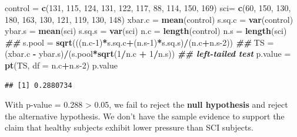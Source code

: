 \documentclass[
]{book}
\newenvironment{Shaded}{\begin{snugshade}}{\end{snugshade}}
\newcommand{\AttributeTok}[1]{\textcolor[rgb]{0.13,0.29,0.53}{#1}}
\newcommand{\DecValTok}[1]{\textcolor[rgb]{0.00,0.00,0.81}{#1}}
\newcommand{\DocumentationTok}[1]{\textcolor[rgb]{0.56,0.35,0.01}{\textbf{\textit{#1}}}}
\newcommand{\FunctionTok}[1]{\textcolor[rgb]{0.13,0.29,0.53}{\textbf{#1}}}
\newcommand{\NormalTok}[1]{#1}
\newcommand{\OtherTok}[1]{\textcolor[rgb]{0.56,0.35,0.01}{#1}}
\newcommand{\SpecialCharTok}[1]{\textcolor[rgb]{0.81,0.36,0.00}{\textbf{#1}}}
\begin{document}
\begin{Shaded}
\begin{Highlighting}[]
\NormalTok{control }\OtherTok{=} \FunctionTok{c}\NormalTok{(}\DecValTok{131}\NormalTok{, }\DecValTok{115}\NormalTok{, }\DecValTok{124}\NormalTok{, }\DecValTok{131}\NormalTok{, }\DecValTok{122}\NormalTok{, }\DecValTok{117}\NormalTok{, }\DecValTok{88}\NormalTok{, }\DecValTok{114}\NormalTok{, }\DecValTok{150}\NormalTok{, }\DecValTok{169}\NormalTok{)}
\NormalTok{sci}\OtherTok{=} \FunctionTok{c}\NormalTok{(}\DecValTok{60}\NormalTok{, }\DecValTok{150}\NormalTok{, }\DecValTok{130}\NormalTok{, }\DecValTok{180}\NormalTok{, }\DecValTok{163}\NormalTok{, }\DecValTok{130}\NormalTok{, }\DecValTok{121}\NormalTok{, }\DecValTok{119}\NormalTok{, }\DecValTok{130}\NormalTok{, }\DecValTok{148}\NormalTok{)}
\NormalTok{xbar.c }\OtherTok{=} \FunctionTok{mean}\NormalTok{(control)}
\NormalTok{s.sq.c }\OtherTok{=} \FunctionTok{var}\NormalTok{(control)}
\NormalTok{ybar.s }\OtherTok{=} \FunctionTok{mean}\NormalTok{(sci)}
\NormalTok{s.sq.s }\OtherTok{=} \FunctionTok{var}\NormalTok{(sci)}
\NormalTok{n.c }\OtherTok{=} \FunctionTok{length}\NormalTok{(control)}
\NormalTok{n.s }\OtherTok{=} \FunctionTok{length}\NormalTok{(sci)}
\DocumentationTok{\#\#}
\NormalTok{s.pool }\OtherTok{=} \FunctionTok{sqrt}\NormalTok{(((n.c}\DecValTok{{-}1}\NormalTok{)}\SpecialCharTok{*}\NormalTok{s.sq.c}\SpecialCharTok{+}\NormalTok{(n.s}\DecValTok{{-}1}\NormalTok{)}\SpecialCharTok{*}\NormalTok{s.sq.s)}\SpecialCharTok{/}\NormalTok{(n.c}\SpecialCharTok{+}\NormalTok{n.s}\DecValTok{{-}2}\NormalTok{))}
\DocumentationTok{\#\# }
\NormalTok{TS }\OtherTok{=}\NormalTok{ (xbar.c }\SpecialCharTok{{-}}\NormalTok{ ybar.s)}\SpecialCharTok{/}\NormalTok{(s.pool}\SpecialCharTok{*}\FunctionTok{sqrt}\NormalTok{(}\DecValTok{1}\SpecialCharTok{/}\NormalTok{n.c }\SpecialCharTok{+} \DecValTok{1}\SpecialCharTok{/}\NormalTok{n.s))}
\DocumentationTok{\#\# left{-}tailed test}
\NormalTok{p.value }\OtherTok{=} \FunctionTok{pt}\NormalTok{(TS, }\AttributeTok{df =}\NormalTok{ n.c}\SpecialCharTok{+}\NormalTok{n.s}\DecValTok{{-}2}\NormalTok{)}
\NormalTok{p.value}
\end{Highlighting}
\end{Shaded}

\begin{verbatim}
## [1] 0.2880734
\end{verbatim}

With p-value = 0.288 \textgreater{} 0.05, we fail to reject the \textbf{null hypothesis} and reject the alternative hypothesis. We don't have the sample evidence to support the claim that healthy subjects exhibit lower pressure than SCI subjects.
\end{document}

